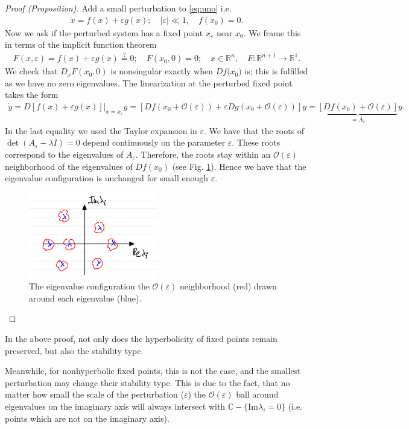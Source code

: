 \begin{proof}[Proof (Proposition)]
	Add a small perturbation to \eqref{eq:uno} i.e.
\begin{align}
	\dot{{x} } = f({x}) + \varepsilon g({x} );\quad |\varepsilon | \ll 1,\quad f({x} _0) =0.
\end{align}
Now we ask if the perturbed system has a fixed point ${x} _{\varepsilon}$ near ${x} _0$. We frame this in terms of the implicit function theorem
\begin{align}
	F({x} ,\varepsilon) = f({x} ) + \varepsilon g({x} ) \stackrel{?}{=} 0;\quad F({x}_0, 0) = 0;\quad {x} \in \mathbb{R}^{n}, \quad F:\mathbb{R}^{n+1} \to \mathbb{R}^{1}.
\end{align}
We check that $D_{{x} }F({x_0} ,0) $ is nonsingular exactly when $Df({x_0)} $ is; this is fulfilled as we have no zero eigenvalues. The linearization at the perturbed fixed point takes the form
\begin{align}
	\dot{{y} } = D \left. \left[ f({x} ) + \varepsilon g({x} ) \right]\right|_{{x} = {x_\varepsilon} }{y} = \left[ Df({x_0}  + \mathcal{O}(\varepsilon)) + \varepsilon Dg({x_0} + \mathcal{O}(\varepsilon)) \right] {y} 
		=\underbrace{ \left[ Df({x_0})+ \mathcal{O}(\varepsilon) \right]}_{={A_{\varepsilon}} }{y}.
\end{align}
In the last equality we used the Taylor expansion in $\varepsilon$. We have that the roots of $\det({A_{\varepsilon}}-\lambda {I} ) = 0 $ depend continuously on the parameter $\varepsilon$. These roots correspond to the eigenvalues of $A_{\varepsilon}$. Therefore, the roots stay within an $\mathcal{O}(\varepsilon)$ neighborhood of the eigenvalues of $Df({x_0} )$ (see Fig. \ref{fig:eps_ball_eigv}). Hence we have that the eigenvalue configuration is unchanged for small enough $\varepsilon$.
\begin{figure}[h!]
	\centering
	\includegraphics[width=0.5\textwidth]{figures/ch2/16eps_ball_eigv.png}
	\caption{The eigenvalue configuration the $\mathcal{O}(\varepsilon)$ neighborhood (red) drawn around each eigenvalue (blue).}
	\label{fig:eps_ball_eigv}
\end{figure}
\end{proof}
\begin{remark}[]
	In the above proof, not only does the hyperbolicity of fixed points remain preserved, but also the stability type.
\end{remark}
Meanwhile, for nonhyperbolic fixed points, this is not the case, and the smallest perturbation may change their stability type. This is due to the fact, that no matter how small the scale of the perturbation ($\varepsilon$) the $\mathcal{O}(\varepsilon)$ ball around eigenvalues on the imaginary axis will always intersect with $\mathbb{C}- \{  \textrm{Im}\lambda_i =0 \}$ (i.e. points which are not on the imaginary axis).

